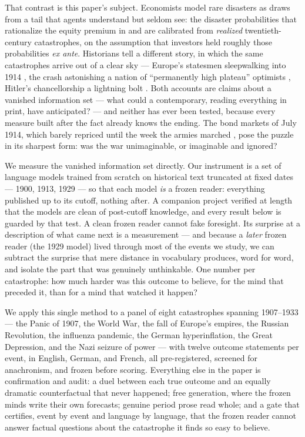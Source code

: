 \documentclass[11pt]{article}
\begin{document}
That contrast is this paper's subject. Economists model rare disasters as draws from a tail that agents
understand but seldom see: the disaster probabilities that rationalize the equity premium in
\citet{rietz1988} and \citet{barro2006} are calibrated from \emph{realized} twentieth-century catastrophes,
on the assumption that investors held roughly those probabilities \emph{ex ante}. Historians tell a
different story, in which the same catastrophes arrive out of a clear sky --- Europe's statesmen sleepwalking
into 1914 \citep{clark2012}, the crash astonishing a nation of ``permanently high plateau'' optimists
\citep{galbraith1955,fisher1930}, Hitler's chancellorship a lightning bolt \citep{turner1996}. Both accounts
are claims about a vanished information set --- what could a contemporary, reading everything in print, have
anticipated? --- and neither has ever been tested, because every measure built after the fact already knows
the ending. The bond markets of July 1914, which barely repriced until the week the armies marched
\citep{ferguson2006}, pose the puzzle in its sharpest form: was the war unimaginable, or imaginable and
ignored?

We measure the vanished information set directly. Our instrument is a set of language models trained from
scratch on historical text truncated at fixed dates --- 1900, 1913, 1929 --- so that each model \emph{is} a
frozen reader: everything published up to its cutoff, nothing after. A companion project verified at length
that the models are clean of post-cutoff knowledge, and every result below is guarded by that test. A clean
frozen reader cannot fake foresight. Its surprise at a description of what came next is a measurement --- and
because a \emph{later} frozen reader (the 1929 model) lived through most of the events we study, we can
subtract the surprise that mere distance in vocabulary produces, word for word, and isolate the part that was
genuinely unthinkable. One number per catastrophe: how much harder was this outcome to believe, for the mind
that preceded it, than for a mind that watched it happen?

We apply this single method to a panel of eight catastrophes spanning 1907--1933 --- the Panic of 1907, the
World War, the fall of Europe's empires, the Russian Revolution, the influenza pandemic, the German
hyperinflation, the Great Depression, and the Nazi seizure of power --- with twelve outcome statements per
event, in English, German, and French, all pre-registered, screened for anachronism, and frozen before
scoring. Everything else in the paper is confirmation and audit: a duel between each true outcome and an
equally dramatic counterfactual that never happened; free generation, where the frozen minds write their own
forecasts; genuine period prose read whole; and a gate that certifies, event by event and language by
language, that the frozen reader cannot answer factual questions about the catastrophe it finds so easy to
believe.
\end{document}
